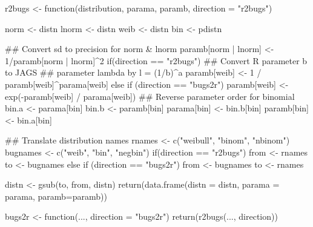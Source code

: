 \begin{example}
r2bugs <- function(distribution, 
                   parama, 
                   paramb, 
                   direction = "r2bugs") {

  norm   <- distn %
  lnorm  <- distn %
  weib   <- distn %
  bin    <- pdistn %

  ## Convert sd to precision for norm & lnorm
  paramb[norm | lnorm] <-  
                      1/paramb[norm | lnorm]^2
  if(direction == "r2bugs"){
    ## Convert R parameter b to JAGS
    ##   parameter lambda by l = (1/b)^a
    paramb[weib] <-   
                 1 / paramb[weib]^parama[weib]
  } else if (direction == "bugs2r") {
    paramb[weib] <- 
                 exp(-paramb[weib] / parama[weib])
  } 
  ## Reverse parameter order for binomial
  bin.a <- parama[bin]
  bin.b <- paramb[bin]
  parama[bin] <- bin.b[bin]
  paramb[bin] <- bin.a[bin]

  ## Translate distribution names
  rnames   <- c("weibull", "binom", "nbinom")
  bugnames <- c("weib", "bin", "negbin")
  if(direction == "r2bugs") {
    from <- rnames
    to   <- bugnames
  } else if (direction == "bugs2r") {
    from <- bugnames
    to   <- rnames
  }
                      
  distn <- gsub(to, from, distn)
  return(data.frame(distn = distn, 
                    parama = parama, 
                    paramb=paramb))
}
bugs2r <- function(..., direction = "bugs2r"){
  return(r2bugs(..., direction))
}
\end{example}
